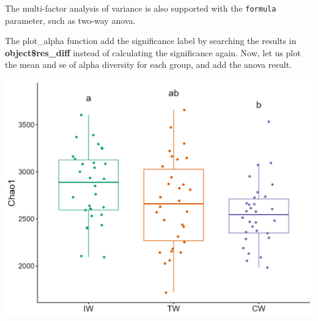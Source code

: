 \documentclass[
]{book}
\newenvironment{Shaded}{\begin{snugshade}}{\end{snugshade}}
\newcommand{\AttributeTok}[1]{\textcolor[rgb]{0.77,0.63,0.00}{#1}}
\newcommand{\CommentTok}[1]{\textcolor[rgb]{0.56,0.35,0.01}{\textit{#1}}}
\newcommand{\ConstantTok}[1]{\textcolor[rgb]{0.00,0.00,0.00}{#1}}
\newcommand{\DecValTok}[1]{\textcolor[rgb]{0.00,0.00,0.81}{#1}}
\newcommand{\FunctionTok}[1]{\textcolor[rgb]{0.00,0.00,0.00}{#1}}
\newcommand{\NormalTok}[1]{#1}
\newcommand{\OtherTok}[1]{\textcolor[rgb]{0.56,0.35,0.01}{#1}}
\newcommand{\SpecialCharTok}[1]{\textcolor[rgb]{0.00,0.00,0.00}{#1}}
\newcommand{\StringTok}[1]{\textcolor[rgb]{0.31,0.60,0.02}{#1}}
\begin{document}
The multi-factor analysis of variance is also supported with the \texttt{formula} parameter, such as two-way anova.

\begin{Shaded}
\end{Shaded}

The plot\_alpha function add the significance label by searching the results in \textbf{object\$res\_diff} instead of calculating the significance again.
Now, let us plot the mean and se of alpha diversity for each group, and add the anova result.

\begin{Shaded}
\end{Shaded}

\begin{center}\includegraphics[width=600px]{Images/trans_alpha_group_letter} \end{center}
\end{document}
